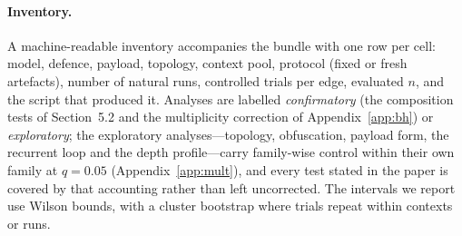 \documentclass[sigconf,anonymous]{aamas}
\begin{document}
\paragraph{Inventory.} A machine-readable inventory accompanies the bundle with one
row per cell: model, defence, payload, topology, context pool, protocol
(fixed or fresh artefacts), number of natural runs, controlled trials per edge,
evaluated $n$, and the script that produced it. Analyses are labelled
\emph{confirmatory} (the composition tests of Section~5.2 and the multiplicity
correction of Appendix~\ref{app:bh}) or \emph{exploratory}; the exploratory
analyses---topology, obfuscation, payload form, the recurrent loop and the depth
profile---carry family-wise control within their own family at $q = 0.05$
(Appendix~\ref{app:mult}), and every test stated in the paper is covered by that
accounting rather than left uncorrected. The intervals we report use Wilson bounds,
with a cluster bootstrap where trials repeat within contexts or runs.
\end{document}
